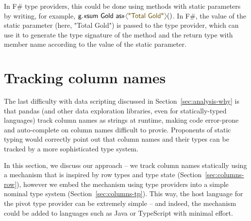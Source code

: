 \documentclass[a4paper,UKenglish]{lipics-v2016}
\theoremstyle{plain}
\theoremstyle{definition}
\newcommand{\langl}{\begin{picture}(4.5,7)
\put(1.1,2.5){\rotatebox{60}{\line(1,0){5.5}}}
\put(1.1,2.5){\rotatebox{300}{\line(1,0){5.5}}}
\end{picture}}
\newcommand{\rangl}{\begin{picture}(4.5,7)
\put(.9,2.5){\rotatebox{120}{\line(1,0){5.5}}}
\put(.9,2.5){\rotatebox{240}{\line(1,0){5.5}}}
\end{picture}}
\newcommand{\str}[1]{\textnormal{\textcolor{strclr}{\sffamily "#1"}}}
\newcommand{\ident}[1]{\textnormal{\sffamily #1}}
\newcommand{\qident}[1]{\textnormal{\sffamily \guillemotleft #1\guillemotright}}
\begin{document}
In F\# type providers, this could be done using methods with static parameters \cite{staticpar} by writing, 
for example, $\ident{g}.\qident{sum Gold as}\langl\str{Total Gold}\rangl()$. In F\#, the value of 
the static parameter (here, \str{Total Gold}) is passed to the type provider, which can use it to
generate the type signature of the method and the return type with member name according to the
value of the static parameter.


\section{Tracking column names}
\label{sec:columns}

The last difficulty with data scripting discussed in Section~\ref{sec:analysis-why} is that pandas 
(and other data exploration libraries, even for statically-typed languages) track column names as 
strings at runtime, making code error-prone and auto-complete on column names difficult to provie.
Proponents of static typing would correctly point out that column names and their types can be
tracked by a more sophisticated type system. 

In this section, we discuss our approach -- we track column names statically using a mechanism
that is inspired by row types and type state (Section~\ref{sec:columns-row}), however we 
embed the mechanism using type providers into a simple nominal type system (Section~\ref{sec:columns-tp}).
This way, the host language for the pivot type provider can be extremely simple -- and indeed, the
mechanism could be added to languages such as Java or TypeScript with minimal effort. 

\end{document}
